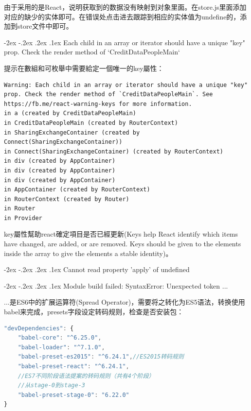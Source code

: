 \documentclass[12pt]{book}
\makeatletter
\numberwithin{dummy}{section}
\theoremstyle{ocrenumbox}
\theoremstyle{blacknumex}
\theoremstyle{blacknumbox}
\theoremstyle{ocrenum}
\renewcommand\paragraph{\@startsection{paragraph}{4}{\z@}
	{-2ex \@plus-.2ex \@minus .2ex}
	{.1ex}
	{\normalfont\small\sffamily\bfseries}}
\makeatother
\begin{document}
由于采用的是React，说明获取到的数据没有映射到对象里面。在store.js里面添加对应的缺少的实体即可。在错误处点击进去跟踪到相应的实体值为undefine的，添加到store文件中即可。

\paragraph{Each child in an array or iterator should have a unique "key" prop. Check the render method of `CreditDataPeopleMain`}

提示在數組和可枚舉中需要給定一個唯一的key屬性：

\begin{lstlisting}
Warning: Each child in an array or iterator should have a unique "key" prop. Check the render method of `CreditDataPeopleMain`. See https://fb.me/react-warning-keys for more information.
in a (created by CreditDataPeopleMain)
in CreditDataPeopleMain (created by RouterContext)
in SharingExchangeContainer (created by Connect(SharingExchangeContainer))
in Connect(SharingExchangeContainer) (created by RouterContext)
in div (created by AppContainer)
in div (created by AppContainer)
in div (created by AppContainer)
in AppContainer (created by RouterContext)
in RouterContext (created by Router)
in Router
in Provider
\end{lstlisting}

key屬性幫助react確定項目是否已經更新(Keys help React identify which items have changed, are added, or are removed. Keys should be given to the elements inside the array to give the elements a stable identity)。

\paragraph{Cannot read property 'apply' of undefined}

\paragraph{Module build failed: SyntaxError: Unexpected token ...}

...是ES6中的扩展运算符(Spread Operator)，需要将之转化为ES5语法，转换使用babel来完成，presets字段设定转码规则，检查是否安装包：

\begin{lstlisting}[language=Javascript]
"devDependencies": {
	"babel-core": "^6.25.0",
	"babel-loader": "^7.1.0",
	"babel-preset-es2015": "^6.24.1",//ES2015转码规则
	"babel-preset-react": "^6.24.1",
	//ES7不同阶段语法提案的转码规则（共有4个阶段）
	//从stage-0到stage-3
	"babel-preset-stage-0": "6.22.0"
}
\end{lstlisting}
\end{document}
